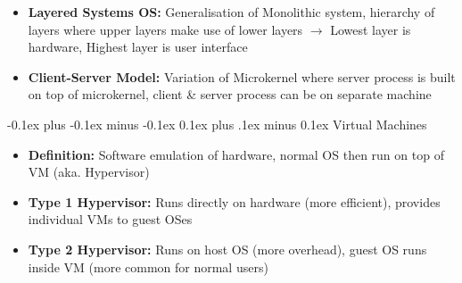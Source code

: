 \documentclass[landscape]{article}
\makeatletter
\renewcommand{\subsection}{\@startsection{subsection}{2}{0mm}%
  {-0.1ex plus -0.1ex minus -0.1ex}%
  {0.1ex plus .1ex minus 0.1ex}%
{\normalfont\scriptsize\bfseries}}
\makeatother
\begin{document}
\begin{multicols*}{5}
\begin{itemize}
      \item \textbf{Layered Systems OS:} Generalisation of Monolithic system, hierarchy of layers where upper layers make use of lower layers $\rightarrow$ Lowest layer is hardware, Highest layer is user interface
      \item \textbf{Client-Server Model:} Variation of Microkernel where server process is built on top of microkernel, client \& server process can be on separate machine
    \end{itemize}

    \subsection{Virtual Machines}
    \begin{itemize}
      \item \textbf{Definition:} Software emulation of hardware, normal OS then run on top of VM (aka. Hypervisor)
      \item \textbf{Type 1 Hypervisor:} Runs directly on hardware (more efficient), provides individual VMs to guest OSes
      \item \textbf{Type 2 Hypervisor:} Runs on host OS (more overhead), guest OS runs inside VM (more common for normal users)
    \end{itemize}


\end{multicols*}
\end{document}
